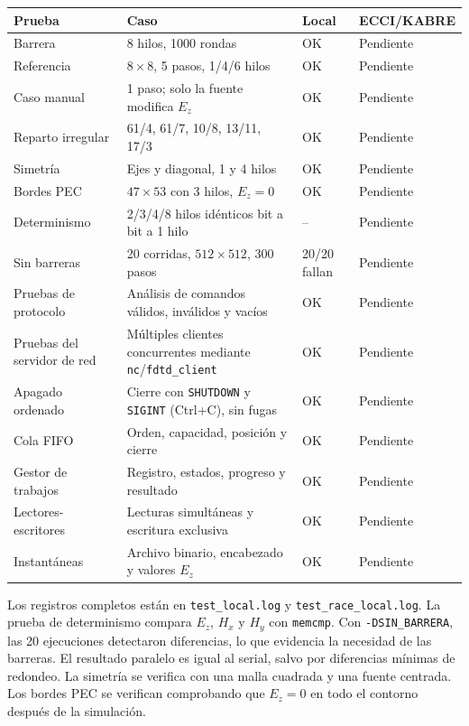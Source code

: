 \documentclass[12pt,a4paper]{article}
\begin{document}
\begin{table}[H]
\centering\scriptsize\sloppy
\begin{tabularx}{\textwidth}{|>{\raggedright\arraybackslash}p{2.2cm}|X|p{1.5cm}|p{1.7cm}|}\hline
\textbf{Prueba} & \textbf{Caso} & \textbf{Local} & \textbf{ECCI/KABRE}\\\hline
Barrera & 8 hilos, 1000 rondas & OK & Pendiente\\\hline
Referencia & $8\times8$, 5 pasos, 1/4/6 hilos & OK & Pendiente\\\hline
Caso manual & 1 paso; solo la fuente modifica $E_z$ & OK & Pendiente\\\hline
Reparto irregular & 61/4, 61/7, 10/8, 13/11, 17/3 & OK & Pendiente\\\hline
Simetría & Ejes y diagonal, 1 y 4 hilos & OK & Pendiente\\\hline
Bordes PEC & $47\times53$ con 3 hilos, $E_z=0$ & OK & Pendiente\\\hline
Determinismo & 2/3/4/8 hilos idénticos bit a bit a 1 hilo & -- & Pendiente\\\hline
Sin barreras & 20 corridas, $512\times512$, 300 pasos & 20/20 fallan & Pendiente\\\hline
Pruebas de protocolo & Análisis de comandos válidos, inválidos y vacíos & OK & Pendiente\\\hline
Pruebas del servidor de red & Múltiples clientes concurrentes mediante \texttt{nc}/\texttt{fdtd\_client} & OK & Pendiente\\\hline
Apagado ordenado & Cierre con \texttt{SHUTDOWN} y \texttt{SIGINT} (Ctrl+C), sin fugas & OK & Pendiente\\\hline
Cola FIFO & Orden, capacidad, posición y cierre & OK & Pendiente\\\hline
Gestor de trabajos & Registro, estados, progreso y resultado & OK & Pendiente\\\hline
Lectores-escritores & Lecturas simultáneas y escritura exclusiva & OK & Pendiente\\\hline
Instantáneas & Archivo binario, encabezado y valores $E_z$ & OK & Pendiente\\\hline
\end{tabularx}
\end{table}

Los registros completos están en \texttt{test\_local.log} y \texttt{test\_race\_local.log}. La prueba de determinismo compara $E_z$, $H_x$ y $H_y$ con \texttt{memcmp}. Con \texttt{-DSIN\_BARRERA}, las 20 ejecuciones detectaron diferencias, lo que evidencia la necesidad de las barreras. El resultado paralelo es igual al serial, salvo por diferencias mínimas de redondeo. La simetría se verifica con una malla cuadrada y una fuente centrada. Los bordes PEC se verifican comprobando que $E_z=0$ en todo el contorno después de la simulación.
\end{document}
